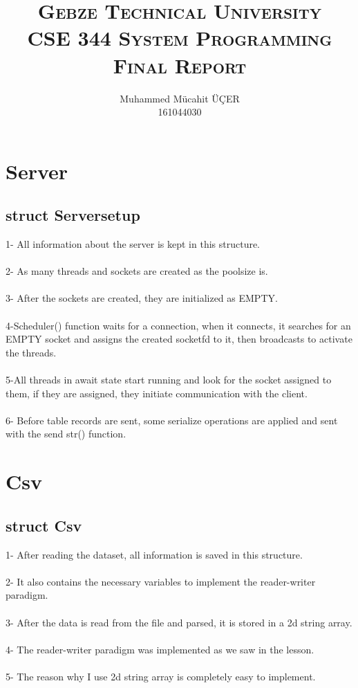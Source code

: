 \documentclass[15pt]{scrartcl} %
\title{	
	\normalfont\normalsize
    \vspace{150pt}
	\textsc{\Large Gebze Technical University}\\ %
	\vspace{100pt} 
	\textsc{\Large CSE 344 System Programming Final Report}\\ %
	\vspace{12pt} 
}
\author{\huge Muhammed Mücahit ÜÇER \\ 161044030} %
\begin{document}
\maketitle %

\newpage
\section{\huge Server}

\subsection{struct Serversetup}
1- All information about the server is kept in this structure.\\\\
2- As many threads and sockets are created as the poolsize is.\\\\
3- After the sockets are created, they are initialized as EMPTY.\\\\
4-Scheduler() function waits for a connection, when it connects, it searches for an EMPTY socket and assigns the created socketfd to it, then broadcasts to activate the threads.\\\\
5-All threads in await state start running and look for the socket assigned to them, if they are assigned, they initiate communication with the client.\\\\
6- Before table records are sent, some serialize operations are applied and sent with the send str() function.

\section{\huge Csv}
\subsection{struct Csv}
1- After reading the dataset, all information is saved in this structure.\\\\
2- It also contains the necessary variables to implement the reader-writer paradigm.\\\\
3- After the data is read from the file and parsed, it is stored in a 2d string array.\\\\
4- The reader-writer paradigm was implemented as we saw in the lesson.\\\\
5- The reason why I use 2d string array is completely easy to implement.
\end{document}
